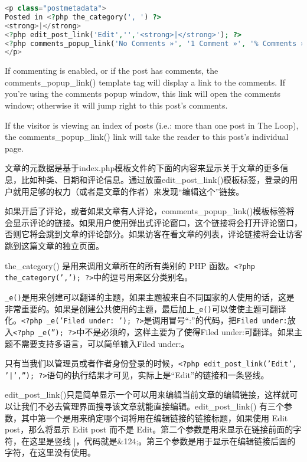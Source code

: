 \begin{lstlisting}[language=PHP]
<p class="postmetadata">
Posted in <?php the_category(', ') ?> 
<strong>|</strong>
<?php edit_post_link('Edit','','<strong>|</strong>'); ?>  
<?php comments_popup_link('No Comments »', '1 Comment »', '% Comments »'); ?>
</p>
\end{lstlisting}

If commenting is enabled, or if the post has comments, the comments\_popup\_link() template tag will display a link to the comments. If you're using the comments popup window, this link will open the comments window; otherwise it will jump right to this post's comments.



If the visitor is viewing an index of posts (i.e.: more than one post in The Loop), the comments\_popup\_link() link will take the reader to this post's individual page.

文章的元数据是基于index.php模板文件的下面的内容来显示关于文章的更多信息，比如种类、日期和评论信息。通过放置edit\_post\_link()模板标签，登录的用户就用足够的权力（或者是文章的作者）来发现“编辑这个”链接。

如果开启了评论，或者如果文章有人评论，comments\_popup\_link()模板标签将会显示评论的链接。如果用户使用弹出式评论窗口，这个链接将会打开评论窗口，否则它将会跳到文章的评论部分。如果访客在看文章的列表，评论链接将会让访客跳到这篇文章的独立页面。

the\_category() 是用来调用文章所在的所有类别的 PHP 函数。\texttt{<?php the\_category(','); ?>}中的逗号用来区分类别名。

\texttt{\_e()}是用来创建可以翻译的主题，如果主题被来自不同国家的人使用的话，这是非常重要的。如果是创建公共使用的主题，最后加上\texttt{\_e()}可以使使主题可翻译化。\texttt{<?php \_e('Filed under: '); ?>}是调用冒号“:”的代码，把\texttt{Filed under:}放入\texttt{<?php \_e(''); ?>}中不是必须的，这样主要为了使得Filed under:可翻译。如果主题不需要支持多语言，可以简单输入Filed under:。

只有当我们以管理员或者作者身份登录的时候，\texttt{<?php edit\_post\_link('Edit', '|',''); ?>}语句的执行结果才可见，实际上是“Edit”的链接和一条竖线。

edit\_post\_link()只是简单显示一个可以用来编辑当前文章的编辑链接，这样就可以让我们不必去管理界面搜寻该文章就能直接编辑。edit\_post\_link() 有三个参数，其中第一个是用来确定哪个词将用在编辑链接的链接标题，如果使用 Edit post，那么将显示 Edit post 而不是 Edit。第二个参数是用来显示在链接前面的字符，在这里是竖线 |，代码就是\&124;。第三个参数是用于显示在编辑链接后面的字符，在这里没有使用。


